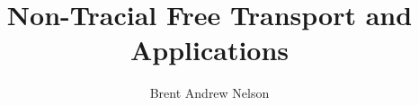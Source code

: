 \documentclass [PhD] {uclathes}
\title          {Non-Tracial Free Transport and Applications}
\author         {Brent Andrew Nelson}
\theoremstyle{definition}
\newcommand{\<}{\left\langle}
\renewcommand{\>}{\right\rangle}
\begin{document}
\makeintropages

%
%




\end{document}
